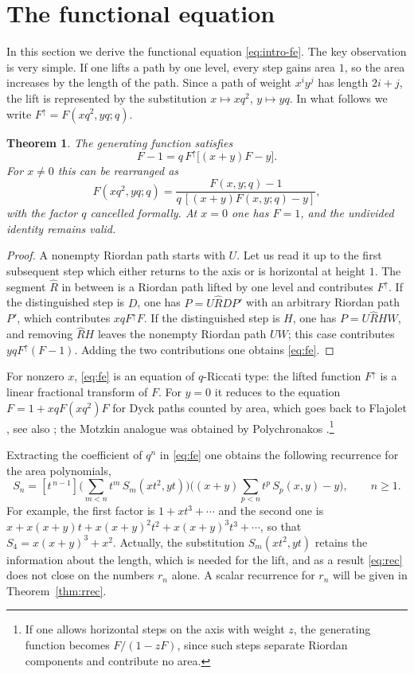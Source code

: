 \documentclass[11pt,reqno]{amsart}
\numberwithin{equation}{section}
\newtheorem{theorem}{Theorem}[section]
\theoremstyle{remark}
\begin{document}
\section{The functional equation}\label{sec:fe}

In this section we derive the functional equation \eqref{eq:intro-fe}. The key observation
is very simple. If one lifts a path by one level, every step gains area $1$, so the area
increases by the length of the path. Since a path of weight $x^iy^j$ has length $2i+j$,
the lift is represented by the substitution $x\mapsto xq^2$, $y\mapsto yq$. In what
follows we write $F^{\uparrow}=F(xq^2,yq;q)$.

\begin{theorem}\label{thm:fe}
The generating function satisfies
\begin{equation}\label{eq:fe}
F-1=q\,F^{\uparrow}\big[(x+y)F-y\big].
\end{equation}
For $x\ne0$ this can be rearranged as
\[
F(xq^2,yq;q)=\frac{F(x,y;q)-1}{q\,[(x+y)F(x,y;q)-y]},
\]
with the factor $q$ cancelled formally. At $x=0$ one has $F=1$, and the undivided
identity remains valid.
\end{theorem}

\begin{proof}
A nonempty Riordan path starts with $U$. Let us read it up to the first subsequent step
which either returns to the axis or is horizontal at height $1$. The segment $\hat R$ in
between is a Riordan path lifted by one level and contributes $F^\uparrow$. If the
distinguished step is $D$, one has $P=U\hat RDP'$ with an arbitrary Riordan path $P'$,
which contributes $xqF^\uparrow F$. If the distinguished step is $H$, one has
$P=U\hat RHW$, and removing $\hat RH$ leaves the nonempty Riordan path $UW$; this case
contributes $yqF^\uparrow(F-1)$. Adding the two contributions one obtains \eqref{eq:fe}.
\end{proof}

For nonzero $x$, \eqref{eq:fe} is an equation of $q$-Riccati type: the lifted function
$F^\uparrow$ is a linear fractional transform of $F$. For $y=0$ it reduces to the
equation $F=1+xqF(xq^2)F$ for Dyck paths counted by area, which goes back to Flajolet
\cite{Flajolet80}, see also \cite{OP12,FS09}; the Motzkin analogue was obtained by
Polychronakos \cite{Poly22}.\footnote{If one allows horizontal steps on the axis with
weight $z$, the generating function becomes $F/(1-zF)$, since such steps separate Riordan
components and contribute no area.}

Extracting the coefficient of $q^n$ in \eqref{eq:fe} one obtains the following recurrence
for the area polynomials,
\begin{equation}\label{eq:rec}
S_n=[t^{\,n-1}]\Big(\sum_{m<n}t^m\,S_m(xt^2,yt)\Big)\Big((x+y)\sum_{p<n}t^p\,S_p(x,y)-y\Big),
\qquad n\ge1 .
\end{equation}
For example, the first factor is $1+xt^3+\cdots$ and the second one is
$x+x(x+y)t+x(x+y)^2t^2+x(x+y)^3t^3+\cdots$, so that $S_4=x(x+y)^3+x^2$. Actually, the
substitution $S_m(xt^2,yt)$ retains the information about the length, which is needed for
the lift, and as a result \eqref{eq:rec} does not close on the numbers $r_n$ alone. A
scalar recurrence for $r_n$ will be given in Theorem~\ref{thm:rrec}.
\end{document}
